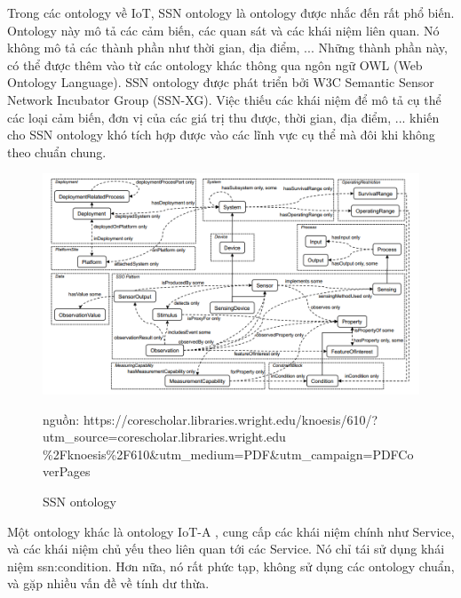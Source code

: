 Trong các ontology về IoT, SSN ontology \cite{ssnontology} là ontology được nhắc đến rất phổ biến. Ontology này mô tả các cảm biến, các quan sát và các khái niệm liên quan. Nó không mô tả các thành phần như thời gian, địa điểm, ... Những thành phần này, có thể được thêm vào từ các ontology khác thông qua ngôn ngữ OWL (Web Ontology Language).
SSN ontology được phát triển bởi W3C Semantic Sensor Network Incubator Group (SSN-XG). Việc thiếu các khái niệm để mô tả cụ thể các loại cảm biến, đơn vị của các giá trị thu được, thời gian, địa điểm, ... khiến cho SSN ontology khó tích hợp được vào các lĩnh vực cụ thể mà đôi khi không theo chuẩn chung.

\begin{figure}[h!]
	\center
	\includegraphics[scale=0.5]{image/ssn_ontology} \\
	\caption{SSN ontology}
	\small nguồn: https://corescholar.libraries.wright.edu/knoesis/610/?utm\_source=corescholar.libraries.wright.edu \%2Fknoesis\%2F610\&utm\_medium=PDF\&utm\_campaign=PDFCoverPages
\end{figure}

Một ontology khác là ontology IoT-A \cite{iotaontology}, cung cấp các khái niệm chính như Service, và các khái niệm chủ yếu theo liên quan tới các Service. Nó chỉ tái sử dụng khái niệm ssn:condition. Hơn nữa, nó rất phức tạp, không sử dụng các ontology chuẩn, và gặp nhiều vấn đề về tính dư thừa. 

